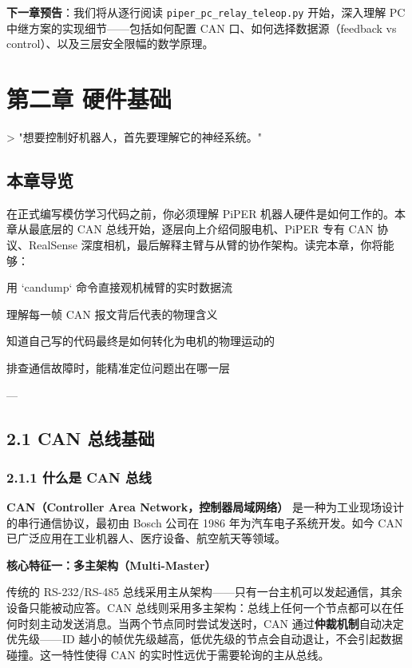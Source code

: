 \documentclass[UTF8,a4paper,11pt]{ctexart}
\begin{document}
\textbf{下一章预告}：我们将从逐行阅读 \texttt{piper_pc_relay_teleop.py} 开始，深入理解 PC 中继方案的实现细节——包括如何配置 CAN 口、如何选择数据源（feedback vs control）、以及三层安全限幅的数学原理。

\endgroup
\newpage

\begingroup
\section{第二章 硬件基础}

> "想要控制好机器人，首先要理解它的神经系统。"

\subsection{本章导览}

在正式编写模仿学习代码之前，你必须理解 PiPER 机器人硬件是如何工作的。本章从最底层的 CAN 总线开始，逐层向上介绍伺服电机、PiPER 专有 CAN 协议、RealSense 深度相机，最后解释主臂与从臂的协作架构。读完本章，你将能够：

\item 用 `candump` 命令直接观机械臂的实时数据流
\item 理解每一帧 CAN 报文背后代表的物理含义
\item 知道自己写的代码最终是如何转化为电机的物理运动的
\item 排查通信故障时，能精准定位问题出在哪一层

---

\subsection{2.1 CAN 总线基础}

\subsubsection{2.1.1 什么是 CAN 总线}

\textbf{CAN（Controller Area Network，控制器局域网络）} 是一种为工业现场设计的串行通信协议，最初由 Bosch 公司在 1986 年为汽车电子系统开发。如今 CAN 已广泛应用在工业机器人、医疗设备、航空航天等领域。

\textbf{核心特征一：多主架构（Multi-Master）}

传统的 RS-232/RS-485 总线采用主从架构——只有一台主机可以发起通信，其余设备只能被动应答。CAN 总线则采用多主架构：总线上任何一个节点都可以在任何时刻主动发送消息。当两个节点同时尝试发送时，CAN 通过\textbf{仲裁机制}自动决定优先级——ID 越小的帧优先级越高，低优先级的节点会自动退让，不会引起数据碰撞。这一特性使得 CAN 的实时性远优于需要轮询的主从总线。
\end{document}

